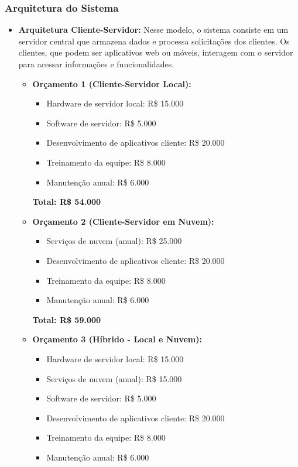 	      \subsubsection{Arquitetura do Sistema}
	\begin{itemize}
		\item \textbf{Arquitetura Cliente-Servidor:} Nesse modelo, o sistema consiste em um servidor central que armazena dados e processa solicitações dos clientes. Os clientes, que podem ser aplicativos web ou móveis, interagem com o servidor para acessar informações e funcionalidades.
		
		\begin{itemize}
			\item \textbf{Orçamento 1 (Cliente-Servidor Local):}
			\begin{itemize}
				\item Hardware de servidor local: R\$ 15.000
				\item Software de servidor: R\$ 5.000
				\item Desenvolvimento de aplicativos cliente: R\$ 20.000
				\item Treinamento da equipe: R\$ 8.000
				\item Manutenção anual: R\$ 6.000
			\end{itemize}
			
			\textbf{Total: R\$ 54.000}
			
			\item \textbf{Orçamento 2 (Cliente-Servidor em Nuvem):}
			\begin{itemize}
				\item Serviços de nuvem (anual): R\$ 25.000
				\item Desenvolvimento de aplicativos cliente: R\$ 20.000
				\item Treinamento da equipe: R\$ 8.000
				\item Manutenção anual: R\$ 6.000
			\end{itemize}
			
			\textbf{Total: R\$ 59.000}
			
			\item \textbf{Orçamento 3 (Híbrido - Local e Nuvem):}
			\begin{itemize}
				\item Hardware de servidor local: R\$ 15.000
				\item Serviços de nuvem (anual): R\$ 15.000
				\item Software de servidor: R\$ 5.000
				\item Desenvolvimento de aplicativos cliente: R\$ 20.000
				\item Treinamento da equipe: R\$ 8.000
				\item Manutenção anual: R\$ 6.000
			\end{itemize}
			

\end{itemize}
\end{itemize}
